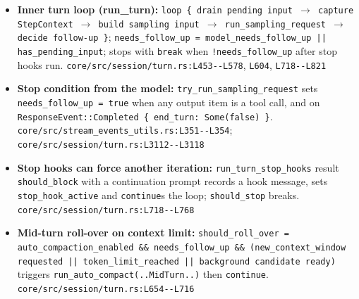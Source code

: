 \begin{itemize}
\item \textbf{Inner turn loop (run\_turn):} \texttt{loop \{ drain pending input $\rightarrow$ capture StepContext $\rightarrow$ build sampling input $\rightarrow$ run\_\allowbreak{}sampling\_\allowbreak{}request $\rightarrow$ decide follow-\allowbreak{}up \}}; \texttt{needs\_\allowbreak{}follow\_\allowbreak{}up = model\_\allowbreak{}needs\_\allowbreak{}follow\_\allowbreak{}up || has\_\allowbreak{}pending\_\allowbreak{}input}; stops with \texttt{break} when \texttt{!needs\_\allowbreak{}follow\_\allowbreak{}up} after stop hooks run. \texttt{core/\allowbreak{}src/\allowbreak{}session/\allowbreak{}turn.\allowbreak{}rs:\allowbreak{}L453-\allowbreak{}-\allowbreak{}L578}, \texttt{L604}, \texttt{L718-\allowbreak{}-\allowbreak{}L821}
\item \textbf{Stop condition from the model:} \texttt{try\_\allowbreak{}run\_\allowbreak{}sampling\_\allowbreak{}request} sets \texttt{needs\_\allowbreak{}follow\_\allowbreak{}up = true} when any output item is a tool call, and on \texttt{ResponseEvent:\allowbreak{}:\allowbreak{}Completed \{ end\_\allowbreak{}turn:\allowbreak{} Some(\allowbreak{}false) \}}. \texttt{core/\allowbreak{}src/\allowbreak{}stream\_\allowbreak{}events\_\allowbreak{}utils.\allowbreak{}rs:\allowbreak{}L351-\allowbreak{}-\allowbreak{}L354}; \texttt{core/\allowbreak{}src/\allowbreak{}session/\allowbreak{}turn.\allowbreak{}rs:\allowbreak{}L3112-\allowbreak{}-\allowbreak{}L3118}
\item \textbf{Stop hooks can force another iteration:} \texttt{run\_\allowbreak{}turn\_\allowbreak{}stop\_\allowbreak{}hooks} result \texttt{should\_\allowbreak{}block} with a continuation prompt records a hook message, sets \texttt{stop\_\allowbreak{}hook\_\allowbreak{}active} and \texttt{continue}s the loop; \texttt{should\_\allowbreak{}stop} breaks. \texttt{core/\allowbreak{}src/\allowbreak{}session/\allowbreak{}turn.\allowbreak{}rs:\allowbreak{}L718-\allowbreak{}-\allowbreak{}L768}
\item \textbf{Mid-turn roll-over on context limit:} \texttt{should\_\allowbreak{}roll\_\allowbreak{}over = auto\_\allowbreak{}compaction\_\allowbreak{}enabled \&\& needs\_\allowbreak{}follow\_\allowbreak{}up \&\& (\allowbreak{}new\_\allowbreak{}context\_\allowbreak{}window requested || token\_\allowbreak{}limit\_\allowbreak{}reached || background candidate ready)} triggers \texttt{run\_\allowbreak{}auto\_\allowbreak{}compact(\allowbreak{}.\allowbreak{}.\allowbreak{}MidTurn.\allowbreak{}.\allowbreak{})} then \texttt{continue}. \texttt{core/\allowbreak{}src/\allowbreak{}session/\allowbreak{}turn.\allowbreak{}rs:\allowbreak{}L654-\allowbreak{}-\allowbreak{}L716}

\end{itemize}
